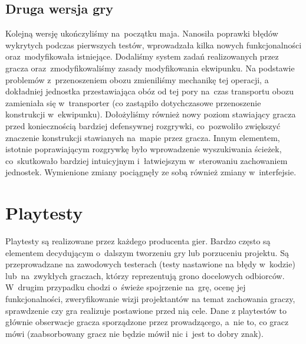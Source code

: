 \documentclass[licencjacka]{pracamgr}
\begin{document}
    \section{Druga wersja gry}
      Kolejną wersję ukończyliśmy na~początku maja. Nanosiła poprawki błędów wykrytych podczas pierwszych testów,
      wprowadzała kilka nowych funkcjonalności oraz~modyfikowała istniejące. Dodaliśmy system zadań realizowanych przez
      gracza oraz~zmodyfikowaliśmy zasady modyfikowania ekwipunku. Na podstawie problemów z~przenoszeniem obozu zmieniliśmy
      mechanikę tej operacji, a dokładniej jednostka przestawiająca obóz od tej pory na~czas transportu obozu zamieniała
      się w~transporter (co zastąpiło dotychczasowe przenoszenie konstrukcji w~ekwipunku). Dołożyliśmy również nowy poziom
      stawiający gracza przed koniecznością bardziej defensywnej rozgrywki, co~pozwoliło zwiększyć znaczenie konstrukcji
      stawianych na~mapie przez gracza. Innym elementem, istotnie poprawiającym rozgrywkę było wprowadzenie wyszukiwania
      ścieżek, co~skutkowało bardziej intuicyjnym i~łatwiejszym w~sterowaniu zachowaniem jednostek. Wymienione zmiany
      pociągnęły ze sobą również zmiany w~interfejsie.

\chapter{Playtesty}
  Playtesty są realizowane przez każdego producenta gier. Bardzo często są elementem decydującym o~dalszym tworzeniu gry
  lub porzuceniu projektu. Są przeprowadzane na zawodowych testerach (testy nastawione na błędy w~kodzie) lub~na~zwykłych
  graczach, którzy reprezentują grono docelowych odbiorców. W~drugim przypadku chodzi o~świeże spojrzenie na~grę,
  ocenę jej funkcjonalności, zweryfikowanie wizji projektantów na temat zachowania graczy, sprawdzenie czy gra
  realizuje postawione przed nią cele. Dane z playtestów to głównie obserwacje gracza sporządzone przez prowadzącego,
  a~nie to, co gracz mówi (zaabsorbowany gracz nie będzie mówił nic i~jest to dobry znak).
\end{document}
